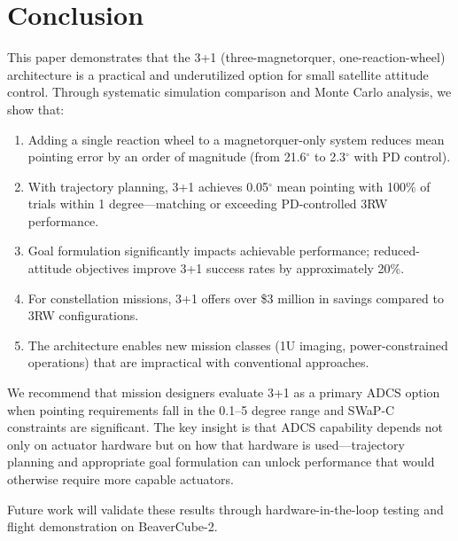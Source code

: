 \documentclass[9pt]{extarticle}
\begin{document}


\section{Conclusion}\label{sec:conclusion}

This paper demonstrates that the 3+1 (three-magnetorquer, one-reaction-wheel) architecture is a practical and underutilized option for small satellite attitude control. Through systematic simulation comparison and Monte Carlo analysis, we show that:

\begin{enumerate}
    \item Adding a single reaction wheel to a magnetorquer-only system reduces mean pointing error by an order of magnitude (from 21.6$^\circ$ to 2.3$^\circ$ with PD control).

    \item With trajectory planning, 3+1 achieves 0.05$^\circ$ mean pointing with 100\% of trials within 1 degree---matching or exceeding PD-controlled 3RW performance.

    \item Goal formulation significantly impacts achievable performance; reduced-attitude objectives improve 3+1 success rates by approximately 20\%.

    \item For constellation missions, 3+1 offers over \$3 million in savings compared to 3RW configurations.

    \item The architecture enables new mission classes (1U imaging, power-constrained operations) that are impractical with conventional approaches.
\end{enumerate}

We recommend that mission designers evaluate 3+1 as a primary ADCS option when pointing requirements fall in the 0.1--5 degree range and SWaP-C constraints are significant. The key insight is that ADCS capability depends not only on actuator hardware but on how that hardware is used---trajectory planning and appropriate goal formulation can unlock performance that would otherwise require more capable actuators.

Future work will validate these results through hardware-in-the-loop testing and flight demonstration on BeaverCube-2.
\end{document}
